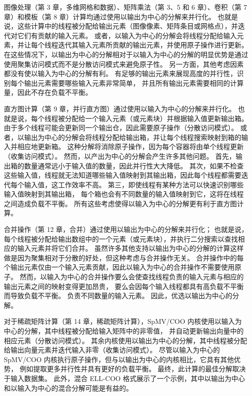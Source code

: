 图像处理（第 3 章，多维网格和数据）、矩阵乘法（第 3、5 和 6 章）、卷积（第 7 章）和模板（第 8 章）计算均通过使用以输出为中心的分解来并行化。 
也就是说，这些计算中的线程被分配给输出元素（图像像素、矩阵条目或网格点），并迭代对它们有贡献的输入元素。 
或者，以输入为中心的分解会将线程分配给输入元素，并让每个线程迭代其输入元素所贡献的输出元素，并使用原子操作进行更新。 
在这些情况下，以输出为中心的分解相对于以输入为中心的分解的明显优势是通过使用聚集访问模式而不是分散访问模式来避免原子性。 
另一方面，其他考虑因素都没有使以输入为中心的分解有利。 
有足够的输出元素来展现高度的并行性，识别每个输出元素需要哪些输入元素非常简单，
并且所有输出元素需要相同的计算量，因此不存在负载不平衡。

直方图计算（第 9 章，并行直方图）通过使用以输入为中心的分解来并行化。 
也就是说，每个线程被分配给一个输入元素（或元素块）并根据输入值更新输出箱。 
由于多个线程可能会更新同一个输出仓，因此需要原子操作（分散访问模式）。 或
者，以输出为中心的分解会将线程分配给输出箱，并让每个线程搜索映射到箱的输入并相应地更新箱。 
这种分解将消除原子操作，因为每个容器将由单个线程更新（收集访问模式）。 
然而，以产出为中心的分解会产生许多其他问题。 首先，输出箱的数量通常远小于输入值的数量，因此并行性大大降低。 
其次，如果不检查这些输入值，线程就无法知道哪些输入值映射到其输出箱，因此每个线程都需要迭代每个输入值，这工作效率不高。 
第三，即使线程有某种方法可以快速识别哪些输入值映射到其输出箱，
每个箱也会有不同数量的输入值映射到它，这将在线程之间造成负载不平衡。 所有这些考虑使得以输入为中心的分解更有利于直方图计算。

合并操作（第 12 章，合并）通过使用以输出为中心的分解来并行化； 
也就是说，每个线程被分配给输出数组中的一个元素（或元素块），并执行二分搜索以查找相应的输入元素并将它们合并。 
虽然许多其他支持以输出为中心的分解的计算这样做是因为聚集相对于分散的好处，但这种考虑与合并操作无关。 
合并操作中的每个输出元素仅由一个输入元素贡献，因此以输入为中心的合并操作不需要使用原子。 
然而，以输入为中心的合并操作要么会使查找线程负责的输入元素与相应的输出元素之间的映射变得更加昂贵，
要么会因每个输入线程都具有高负载不平衡而导致负载不平衡。 负责不同数量的输入元素。 因此，优选以输出为中心的分解。

对于稀疏矩阵计算（第 14 章，稀疏矩阵计算），SpMV/COO 内核使用以输入为中心的分解，其中线程被分配给输入矩阵中的非零值，
并自动更新输出向量中的相应元素（分散访问模式）。 
其余内核使用以输出为中心的分解，其中线程被分配给输出向量元素并迭代输入非零（收集访问模式）。 
尽管以输入为中心的 SpMV/COO 内核执行原子操作，但与以输出为中心的内核相比，它具有其他优势，
例如提取更多并行性并具有更好的负载平衡。 最终，此计算的最佳分解取决于输入数据集。 
此外，混合 ELL-COO 格式展示了一个示例，其中以输出为中心和以输入为中心的混合分解可能是有益的。

